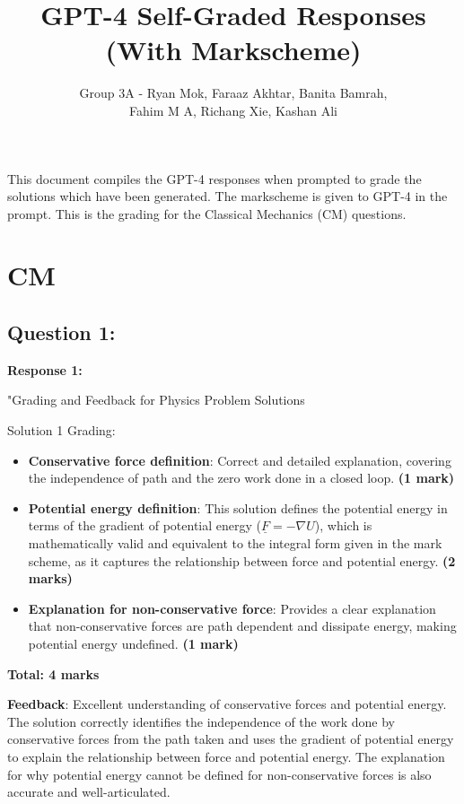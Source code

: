 \documentclass[a4paper,11pt]{article}
\begin{document}
\title{GPT-4 Self-Graded Responses (With Markscheme)}
\author{Group 3A - Ryan Mok, Faraaz Akhtar, Banita Bamrah, \\ Fahim M A, Richang Xie, Kashan Ali }
\date{}
\maketitle

This document compiles the GPT-4 responses when prompted to grade the solutions which have been generated. The markscheme is given to GPT-4 in the prompt. This is the grading for the Classical Mechanics (CM) questions. 

\section{CM}

\subsection*{Question 1:}

\textbf{Response 1:}

"Grading and Feedback for Physics Problem Solutions

Solution 1 Grading:

\begin{itemize}
    \item \textbf{Conservative force definition}: Correct and detailed explanation, covering the independence of path and the zero work done in a closed loop. \textbf{(1 mark)}
    \item \textbf{Potential energy definition}: This solution defines the potential energy in terms of the gradient of potential energy (\( \underline{F} = -\nabla U \)), which is mathematically valid and equivalent to the integral form given in the mark scheme, as it captures the relationship between force and potential energy. \textbf{(2 marks)}
    \item \textbf{Explanation for non-conservative force}: Provides a clear explanation that non-conservative forces are path dependent and dissipate energy, making potential energy undefined. \textbf{(1 mark)}
\end{itemize}

\textbf{Total: 4 marks}

\textbf{Feedback}: Excellent understanding of conservative forces and potential energy. The solution correctly identifies the independence of the work done by conservative forces from the path taken and uses the gradient of potential energy to explain the relationship between force and potential energy. The explanation for why potential energy cannot be defined for non-conservative forces is also accurate and well-articulated.
\end{document}
